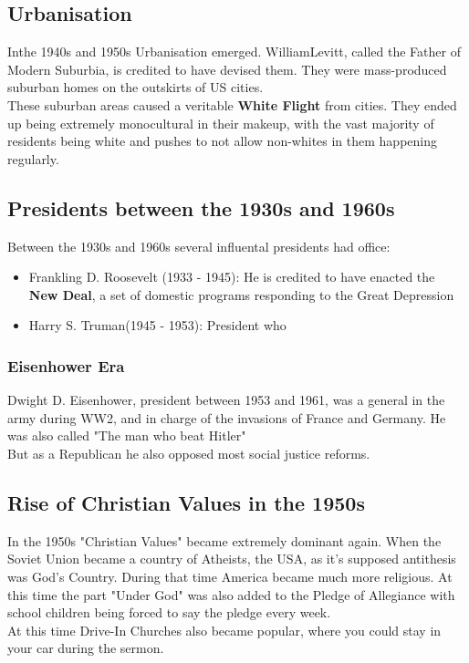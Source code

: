 \documentclass{article}
\begin{document}
	\subsection{Urbanisation}
	Inthe 1940s and 1950s Urbanisation emerged. WilliamLevitt, called the Father of Modern Suburbia, is credited to have devised them. They were mass-produced suburban homes on the outskirts of US cities. \\
	These suburban areas caused a veritable \textbf{White Flight} from cities. They ended up being extremely monocultural in their makeup, with the vast majority of residents being white and pushes to not allow non-whites in them happening regularly. \\
	\subsection{Presidents between the 1930s and 1960s}
	Between the 1930s and 1960s several influental presidents had office:
	\begin{itemize}
		\item{Frankling D. Roosevelt (1933 - 1945): He is credited to have enacted the \textbf{New Deal}, a set of domestic programs responding to the Great Depression}
		\item{Harry S. Truman(1945 - 1953): President who}
	\end{itemize}
	\subsubsection{Eisenhower Era}
	Dwight D. Eisenhower, president between 1953 and 1961, was a general in the army during WW2, and in charge of the invasions of France and Germany. He was also called "The man who beat Hitler" \\
	But as a Republican he also opposed most social justice reforms.
	\subsection{Rise of Christian Values in the 1950s}
	In the 1950s "Christian Values" became extremely dominant again. When the Soviet Union became a country of Atheists, the USA, as it's supposed antithesis was God's Country. During that time America became much more religious. At this time the part "Under God" was also added to the Pledge of Allegiance with school children being forced to say the pledge every week. \\
	At this time Drive-In Churches also became popular, where you could stay in your car during the sermon. \\
\end{document}

